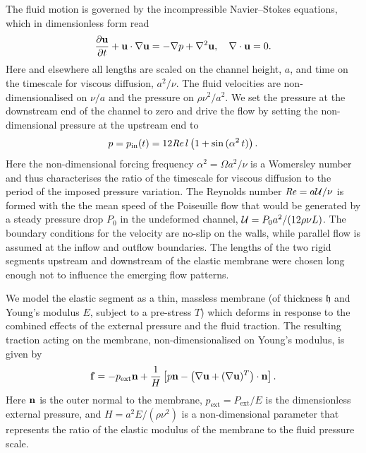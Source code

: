 \documentclass[aps,prl,reprint,superscriptaddress,floatfix]{revtex4-1}
\newcommand{\Rey}{\mathit{Re}}
\begin{document}
The fluid motion is governed by the incompressible Navier--Stokes
equations, which in dimensionless form read
\begin{equation}
\dfrac{\partial {\bf u}}{\partial t} + {\bf u} \cdot \nabla {\bf
u} = -\nabla  p + \nabla^2  {\bf u},\quad
\nabla \cdot {\bf u}= 0.
\label{eq:NSeqn}
\end{equation}
Here and elsewhere all lengths are scaled on the channel height,
$a$, and time on the timescale for viscous diffusion, $a^2/\nu$.
The fluid velocities are non-dimensionalised on $\nu/a$ and the
pressure on $\rho\nu^2/a^2$.
We set the pressure at the downstream end of the channel to zero
and drive the flow by setting the non-dimensional pressure at the
upstream end to
\begin{equation}
\label{inflow_bc}
p = p_{\rm in}(t)=12 \Rey \,l \left(1 + \sin\,(\alpha^2 \, t)\right).
\end{equation}
Here the non-dimensional forcing frequency $\alpha^2 = \Omega a^2/\nu$ is
a Womersley number and thus characterises the ratio of the
timescale for viscous diffusion to the period of the imposed pressure variation.
The Reynolds number $\Rey = a{\cal U}/\nu$ is formed with the the mean
speed of the Poiseuille flow that would be generated by a steady pressure
drop $P_0$ in the undeformed channel, ${\cal U} = P_0 a^2/(12 \rho \nu
L)$. The boundary conditions for the velocity are no-slip on the walls,
while parallel flow is assumed at the inflow and outflow
boundaries. The lengths of the two rigid segments upstream and
downstream of the elastic membrane were chosen long enough not to
influence the emerging flow patterns. 

We model the elastic segment as a thin, massless
membrane (of thickness $\mathfrak{h}$ and Young's modulus $E$, subject to a
pre-stress $T$) which deforms in
response to the combined effects of the external pressure
and the fluid traction. The resulting traction acting on the
membrane, non-dimensionalised on Young's modulus, is given by
\begin{equation}
\label{eq:nondimloadvector}
{\bf f}=-p_\text{ext} {\bf n} + \frac{1}{H} \left[ p {\bf n} -
  \left(\nabla {\bf u} + (\nabla {\bf u})^T\right) \cdot {\bf n} \right].
\end{equation}
Here ${\bf n}$ is the outer normal to the membrane,
$p_\text{ext}=P_\text{ext}/E$ is the dimensionless external
pressure, and  $H=a^2 E/(\rho\nu^2)$  is a non-dimensional parameter
that represents the ratio of the elastic modulus of the membrane to
the fluid pressure scale. 
\end{document}
